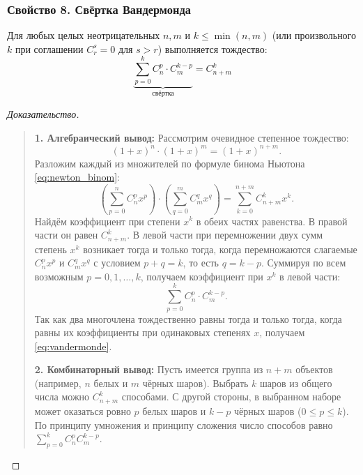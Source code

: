 \subsubsection{Свойство 8. Свёртка Вандермонда}

\begin{theorem}
    Для любых целых неотрицательных $n, m$ и $k \le \min(n, m)$ (или 
    произвольного $k$ при соглашении $C_r^s = 0$ для $s > r$) выполняется 
    тождество:
    \begin{equation} \label{eq:vandermonde}
        \underbrace{\sum_{p=0}^{k} C_n^p \cdot C_m^{k-p}}_{\text{свёртка}} = 
        C_{n+m}^k \tag{10}
    \end{equation}
\end{theorem}

\begin{proof}[Доказательство]~\\
    \begin{quote}
        \textbf{1. Алгебраический вывод:} 
        Рассмотрим очевидное степенное тождество:
        \[
            (1 + x)^n \cdot (1 + x)^m = (1 + x)^{n+m}.
        \]
        Разложим каждый из множителей по формуле бинома Ньютона 
        \eqref{eq:newton_binom}:
        \[
            \left(\sum_{p=0}^{n} C_n^p x^p\right) \cdot 
            \left(\sum_{q=0}^{m} C_m^q x^q\right) = 
            \sum_{k=0}^{n+m} C_{n+m}^k x^k.
        \]
        Найдём коэффициент при степени $x^k$ в обеих частях равенства. В 
        правой части он равен $C_{n+m}^k$. В левой части при перемножении 
        двух сумм степень $x^k$ возникает тогда и только тогда, когда 
        перемножаются слагаемые $C_n^p x^p$ и $C_m^q x^q$ с условием 
        $p + q = k$, то есть $q = k - p$. Суммируя по всем возможным 
        $p = 0, 1, \dots, k$, получаем коэффициент при $x^k$ в левой части:
        \[
            \sum_{p=0}^{k} C_n^p \cdot C_m^{k-p}.
        \]
        Так как два многочлена тождественно равны тогда и только тогда, 
        когда равны их коэффициенты при одинаковых степенях $x$, 
        получаем \eqref{eq:vandermonde}.

        \textbf{2. Комбинаторный вывод:} 
        Пусть имеется группа из $n + m$ объектов (например, $n$ белых и 
        $m$ чёрных шаров). Выбрать $k$ шаров из общего числа можно 
        $C_{n+m}^k$ способами. С другой стороны, в выбранном наборе может 
        оказаться ровно $p$ белых шаров и $k - p$ чёрных шаров 
        ($0 \le p \le k$). По принципу умножения и принципу сложения число 
        способов равно $\sum_{p=0}^k C_n^p C_m^{k-p}$.
    \end{quote}
\end{proof}

